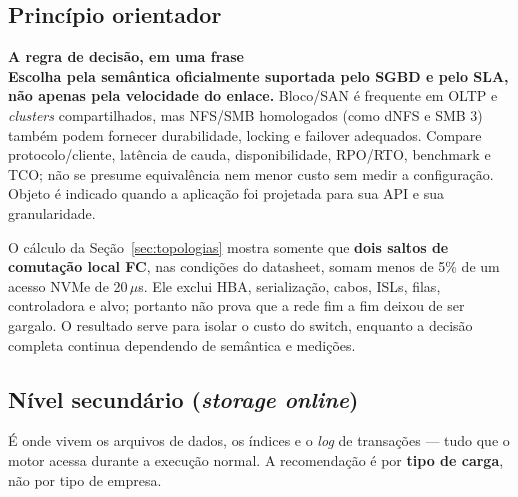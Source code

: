\documentclass[11pt,a4paper]{article}
\newcommand{\destaque}[2]{%
  \begin{center}\begin{minipage}{0.96\textwidth}
  \colorbox{fundo}{\begin{minipage}{\dimexpr\linewidth-2\fboxsep}
  \vspace{2pt}\textbf{\color{azul}\small #1}\\[1pt]\footnotesize #2\vspace{3pt}
  \end{minipage}}\end{minipage}\end{center}}
\begin{document}
\subsection{Princípio orientador}

\destaque{A regra de decisão, em uma frase}{%
\textbf{Escolha pela semântica oficialmente suportada pelo SGBD e pelo SLA, não apenas pela
velocidade do enlace.} Bloco/SAN é frequente em OLTP e \textit{clusters} compartilhados,
mas NFS/SMB homologados (como dNFS e SMB 3) também podem fornecer durabilidade, locking e
failover adequados. Compare protocolo/cliente, latência de cauda, disponibilidade, RPO/RTO,
benchmark e TCO; não se presume equivalência nem menor custo sem medir a configuração.
Objeto é indicado quando a aplicação foi projetada para sua API e sua granularidade.}

O cálculo da Seção~\ref{sec:topologias} mostra somente que \textbf{dois saltos de comutação
local FC}, nas condições do datasheet, somam menos de 5\% de um acesso NVMe de 20\,$\mu$s.
Ele exclui HBA, serialização, cabos, ISLs, filas, controladora e alvo; portanto não prova
que a rede fim a fim deixou de ser gargalo. O resultado serve para isolar o custo do
switch, enquanto a decisão completa continua dependendo de semântica e medições.

\subsection{Nível secundário (\textit{storage online})}
\label{sec:recsecundario}

É onde vivem os arquivos de dados, os índices e o \textit{log} de transações --- tudo que o motor
acessa durante a execução normal. A recomendação é por \textbf{tipo de carga}, não por tipo de
empresa.
\end{document}

